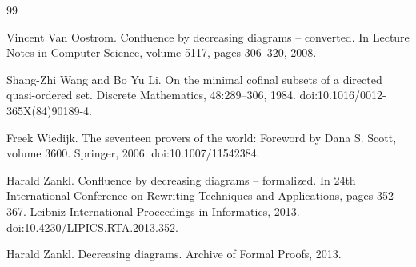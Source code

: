 \documentclass[10pt,a4paper]{amsart}
\begin{document}
\begin{thebibliography}{99}
\par\noindent  [42]  Vincent Van Oostrom.  Confluence by decreasing diagrams – converted.  In Lecture Notes in Computer Science, volume 5117, pages 306–320, 2008.  
 
\par\noindent  [43]  Shang-Zhi Wang and Bo Yu Li.  On the minimal cofinal subsets of a directed quasi-ordered set.  Discrete Mathematics, 48:289–306, 1984.  doi:10.1016/0012-365X(84)90189-4.  
 
\par\noindent  [44]  Freek Wiedijk.  The seventeen provers of the world: Foreword by Dana S. Scott, volume 3600.  Springer, 2006.  doi:10.1007/11542384.  
 
\par\noindent  [45]  Harald Zankl.  Confluence by decreasing diagrams – formalized.  In 24th International Conference on Rewriting Techniques and Applications, pages 352–367. Leibniz International Proceedings in Informatics, 2013.  doi:10.4230/LIPICS.RTA.2013.352.  
 
\par\noindent  [46]  Harald Zankl.  Decreasing diagrams.  Archive of Formal Proofs, 2013.  
  
\end{thebibliography}
\end{document}
